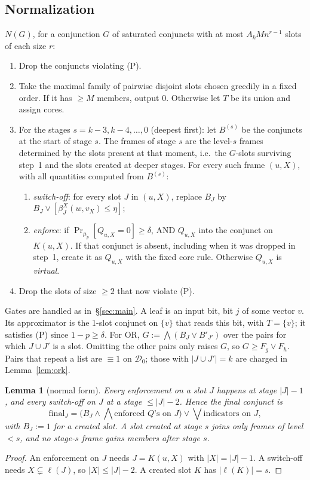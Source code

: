 \documentclass[11pt,a4paper]{article}
\theoremstyle{plain}
\newtheorem{lemma}[theorem]{Lemma}
\theoremstyle{definition}
\theoremstyle{remark}
\newcommand{\Dz}{\mathcal{D}_0}
\begin{document}
\subsection{Normalization}
$N(G)$, for a conjunction $G$ of saturated conjuncts with at most $A_kMn^{r-1}$ slots of each size $r$:
\begin{enumerate}
  \item Drop the conjuncts violating (P).
  \item Take the maximal family of pairwise disjoint slots chosen greedily in a fixed order. If it has $\ge M$
    members, output 0. Otherwise let $T$ be its union and assign cores.
  \item For the stages $s=k-3,k-4,\dots,0$ (deepest first): let $B^{(s)}$ be the conjuncts at the start of stage
    $s$. The frames of stage $s$ are the level-$s$ frames determined by the slots present at that moment, i.e.\ the
    $G$-slots surviving step~1 and the slots created at deeper stages. For every such frame $(u,X)$, with all
    quantities computed from $B^{(s)}$:
    \begin{enumerate}[label=(\alph*)]
      \item \emph{switch-off}: for every slot $J$ in $(u,X)$, replace $B_J$ by $B_J\vee[\beta^X_J(w,v_X)\le\eta]$;
      \item \emph{enforce}: if $\Pr_{\mu_p}[Q_{u,X}=0]\ge\delta$, AND $Q_{u,X}$ into the conjunct on $K(u,X)$. If
        that conjunct is absent, including when it was dropped in step~1, create it as $Q_{u,X}$ with the fixed core
        rule. Otherwise $Q_{u,X}$ is \emph{virtual}.
    \end{enumerate}
  \item Drop the slots of size $\ge2$ that now violate (P).
\end{enumerate}
Gates are handled as in~\S\ref{sec:main}. A leaf is an input bit, bit $j$ of some vector $v$. Its approximator is the 1-slot
conjunct on $\{v\}$ that reads this bit, with $T=\{v\}$; it satisfies (P) since $1-p\ge\delta$. For OR,
$G:=\bigwedge(B_J\vee B'_{J'})$ over the pairs for which $J\cup J'$ is a
slot. Omitting the other pairs only raises $G$, so $G\ge F_g\vee F_h$. Pairs that repeat a list are $\equiv1$ on
$\Dz$; those with $|J\cup J'|=k$ are charged in Lemma~\ref{lem:ork}.

\begin{lemma}[normal form]\label{lem:nf}
Every enforcement on a slot $J$ happens at stage $|J|-1$, and every switch-off on $J$ at a stage $\le|J|-2$. Hence
the final conjunct is
\[
\mathrm{final}_J=\Big(B_J\wedge\bigwedge\text{enforced }Q\text{'s on }J\Big)\vee\bigvee\text{indicators on }J,
\]
with $B_J:=1$ for a created slot. A slot created at stage $s$ joins only frames of level $<s$, and no stage-$s$ frame
gains members after stage $s$.
\end{lemma}
\begin{proof}
An enforcement on $J$ needs $J=K(u,X)$ with $|X|=|J|-1$. A switch-off needs $X\subsetneq\ell(J)$, so
$|X|\le|J|-2$. A created slot $K$ has $|\ell(K)|=s$.
\end{proof}
\end{document}
